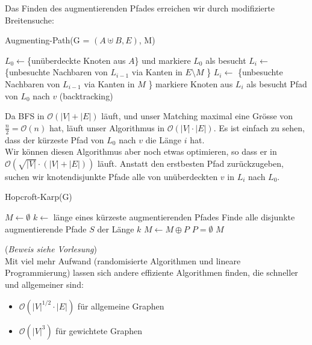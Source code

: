 \pagebreak
Das Finden des augmentierenden Pfades erreichen wir durch modifizierte Breitensuche:

\begin{algorithm}
    \caption{Augmenting-Path(G = $(A \uplus B, E)$, M)}
    \begin{algorithmic}[1]
        \State $L_0 \leftarrow $\{unüberdeckte Knoten aus $A$\} und markiere $L_0$ als besucht
                \State $L_i \leftarrow $ \{unbesuchte Nachbaren von $L_{i-1}$ via Kanten in $E \setminus M$ \}
            \Else 
                \State $L_i \leftarrow $ \{unbesuchte Nachbaren von $L_{i-1}$ via Kanten in $M$ \}
            \EndIf
            \State markiere Knoten aus $L_i$ als besucht
                \State \Return Pfad von $L_0$ nach $v$ (backtracking)
            \EndIf
        \EndFor
    \end{algorithmic}
\end{algorithm}

Da BFS in $\mathcal{O}(|V| + |E|)$ läuft, und unser Matching maximal eine Grösse von $\frac{n}{2} = \mathcal{O}(n)$
hat, läuft unser Algorithmus in $\mathcal{O}(|V| \cdot |E|)$. Es ist einfach zu sehen, dass der kürzeste Pfad von
$L_0$ nach $v$ die Länge $i$ hat. \\

Wir können diesen Algorithmus aber noch etwas optimieren, so dass er in $\mathcal{O}(\sqrt{|V|} \cdot (|V| + |E|))$ läuft. Anstatt den erstbesten Pfad
zurückzugeben, suchen wir knotendisjunkte Pfade alle von unüberdeckten $v$ in $L_i$ nach $L_0$.

\begin{algorithm}
    \caption{Hopcroft-Karp(G)}
    \begin{algorithmic}[1]
        \State $M \leftarrow \emptyset$
        \Repeat
            \State $k \leftarrow$ länge eines kürzeste augmentierenden Pfades
            \State Finde alle disjunkte augmentierende Pfade $S$ der Länge $k$
                \State $M \leftarrow M \oplus P$
            \EndFor
        \Until $P = \emptyset$
        \State \Return $M$
    \end{algorithmic}
\end{algorithm}
(\textit{Beweis siehe Vorlesung}) \\

Mit viel mehr Aufwand (randomisierte Algorithmen und lineare Programmierung) lassen sich andere effiziente Algorithmen finden,
die schneller und allgemeiner sind:
\begin{itemize}
    \item $\mathcal{O}(|V|^{1/2} \cdot |E|)$ für allgemeine Graphen
    \item $\mathcal{O}(|V|^{3})$ für gewichtete Graphen
\end{itemize}

